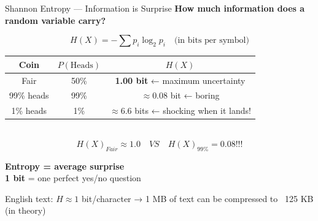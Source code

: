 \documentclass{beamer}
\begin{document}
\begin{frame}{Shannon Entropy — Information is Surprise}
\small
\centering
\textbf{How much \textcolor{new_turquoise}{information} does a random variable carry?}

\vspace{.1cm}
\[
H(X) = -\sum p_i \log_2 p_i \quad \text{(in bits per symbol)}
\]

\vspace{0.1cm}
\begin{tabular}{ccc}
Coin & $P(\text{Heads})$ & $H(X)$ \\ \hline
Fair         & 50\%  & \textbf{1.00 bit}  ← maximum uncertainty \\
99\% heads   & 99\%  & $\approx 0.08$ bit ← boring \\
1\% heads    & 1\%   & $\approx 6.6$ bits ← shocking when it lands!
\end{tabular} \\

$$H(X)_{Fair} \approx 1.0 \quad VS \quad H(X)_{99\%} = 0.08!!! $$


\vspace{.1cm}
\large
\textcolor{new_turquoise}{\textbf{Entropy = average surprise}} \\
\textbf{1 bit} = one perfect yes/no question

\vspace{0.5cm}
\small
English text: $H \approx 1$ bit/character  
→ 1 MB of text can be compressed to ~125 KB (in theory)
\end{frame}
\end{document}
